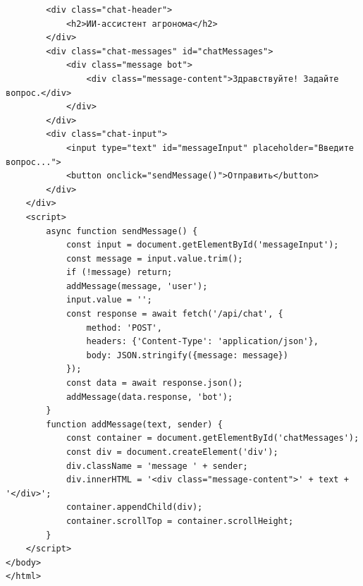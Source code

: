 \documentclass[14pt, a4paper]{extarticle}
\begin{document}
\begin{verbatim}
        <div class="chat-header">
            <h2>ИИ-ассистент агронома</h2>
        </div>
        <div class="chat-messages" id="chatMessages">
            <div class="message bot">
                <div class="message-content">Здравствуйте! Задайте вопрос.</div>
            </div>
        </div>
        <div class="chat-input">
            <input type="text" id="messageInput" placeholder="Введите вопрос...">
            <button onclick="sendMessage()">Отправить</button>
        </div>
    </div>
    <script>
        async function sendMessage() {
            const input = document.getElementById('messageInput');
            const message = input.value.trim();
            if (!message) return;
            addMessage(message, 'user');
            input.value = '';
            const response = await fetch('/api/chat', {
                method: 'POST',
                headers: {'Content-Type': 'application/json'},
                body: JSON.stringify({message: message})
            });
            const data = await response.json();
            addMessage(data.response, 'bot');
        }
        function addMessage(text, sender) {
            const container = document.getElementById('chatMessages');
            const div = document.createElement('div');
            div.className = 'message ' + sender;
            div.innerHTML = '<div class="message-content">' + text + '</div>';
            container.appendChild(div);
            container.scrollTop = container.scrollHeight;
        }
    </script>
</body>
</html>
\end{verbatim}
\end{document}
